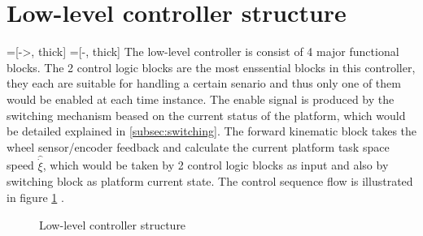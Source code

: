 \section{Low-level controller structure}
\label{sec:structure}
=[->, thick]
=[-, thick]
The low-level controller is consist of 4 major functional blocks. The 2 control logic blocks are the most enssential blocks in this controller, they each are suitable for handling a certain senario and thus only 
one of them would be enabled at each time instance. The enable signal is produced by the switching mechanism beased on the current status of the platform, which would be detailed explained in \cref{subsec:switching}.
The forward kinematic block takes the wheel sensor/encoder feedback and calculate the current platform task space speed $\hat{\dot{\xi}} $, which would be taken by 2 control logic blocks as input and also by 
switching block as platform current state. The control sequence flow is illustrated in figure \cref{fig:controller} .
\begin{figure}[t]\label{fig:controller}
	\begin{center}
	\end{center}
	\caption{Low-level controller structure}
\end{figure}
